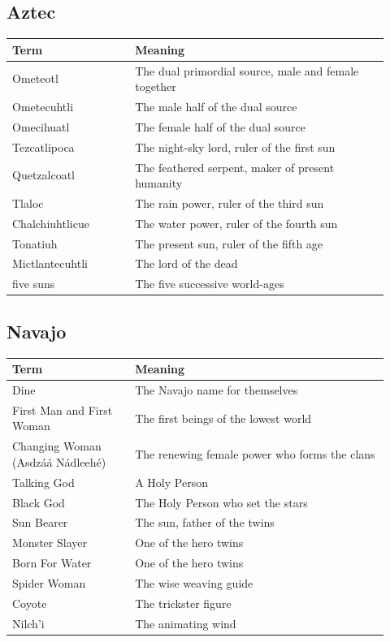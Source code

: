 \subsection{Aztec}

\begin{longtable}{L{0.30\linewidth} L{0.62\linewidth}}
\toprule
\textbf{Term} & \textbf{Meaning} \\
\midrule
\endhead
Ometeotl & The dual primordial source, male and female together \\
Ometecuhtli & The male half of the dual source \\
Omecihuatl & The female half of the dual source \\
Tezcatlipoca & The night-sky lord, ruler of the first sun \\
Quetzalcoatl & The feathered serpent, maker of present humanity \\
Tlaloc & The rain power, ruler of the third sun \\
Chalchiuhtlicue & The water power, ruler of the fourth sun \\
Tonatiuh & The present sun, ruler of the fifth age \\
Mictlantecuhtli & The lord of the dead \\
five suns & The five successive world-ages \\
\bottomrule
\end{longtable}

\subsection{Navajo}

\begin{longtable}{L{0.30\linewidth} L{0.62\linewidth}}
\toprule
\textbf{Term} & \textbf{Meaning} \\
\midrule
\endhead
Dine & The Navajo name for themselves \\
First Man and First Woman & The first beings of the lowest world \\
Changing Woman (Asdz\'a\'a N\'adleeh\'e) & The renewing female power who forms the clans \\
Talking God & A Holy Person \\
Black God & The Holy Person who set the stars \\
Sun Bearer & The sun, father of the twins \\
Monster Slayer & One of the hero twins \\
Born For Water & One of the hero twins \\
Spider Woman & The wise weaving guide \\
Coyote & The trickster figure \\
Nilch'i & The animating wind \\
\bottomrule
\end{longtable}

